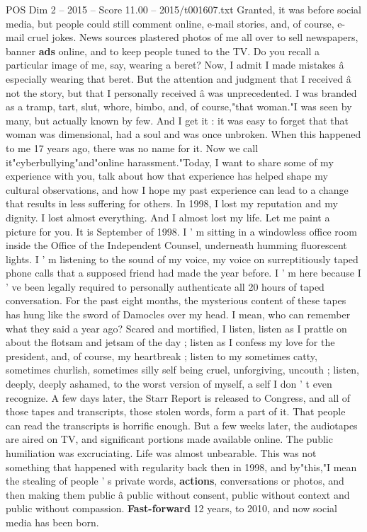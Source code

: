 \begin{textsample}{POS Dim 2 – 2015 – Score 11.00 – 2015/t001607.txt}
Granted, it was before social media, but people could still comment online, e-mail stories, and, of course, e-mail cruel jokes.
News sources plastered photos of me all over to sell newspapers, banner \textbf{ads} online, and to keep people tuned to the TV.
Do you recall a particular image of me, say, wearing a beret?
Now, I admit I made mistakes â especially wearing that beret.
But the attention and judgment that I received â not the story, but that I personally received â was unprecedented.
I was branded as a tramp, tart, slut, whore, bimbo, and, of course,"that woman."I was seen by many, but actually known by few.
And I get it : it was easy to forget that that woman was dimensional, had a soul and was once unbroken.
When this happened to me 17 years ago, there was no name for it.
Now we call it"cyberbullying"and"online harassment."Today, I want to share some of my experience with you, talk about how that experience has helped shape my cultural observations, and how I hope my past experience can lead to a change that results in less suffering for others.
In 1998, I lost my reputation and my dignity.
I lost almost everything.
And I almost lost my life.
Let me paint a picture for you.
It is September of 1998.
I ' m sitting in a windowless office room inside the Office of the Independent Counsel, underneath humming fluorescent lights.
I ' m listening to the sound of my voice, my voice on surreptitiously taped phone calls that a supposed friend had made the year before.
I ' m here because I ' ve been legally required to personally authenticate all 20 hours of taped conversation.
For the past eight months, the mysterious content of these tapes has hung like the sword of Damocles over my head.
I mean, who can remember what they said a year ago?
Scared and mortified, I listen, listen as I prattle on about the flotsam and jetsam of the day ; listen as I confess my love for the president, and, of course, my heartbreak ; listen to my sometimes catty, sometimes churlish, sometimes silly self being cruel, unforgiving, uncouth ; listen, deeply, deeply ashamed, to the worst version of myself, a self I don ' t even recognize.
A few days later, the Starr Report is released to Congress, and all of those tapes and transcripts, those stolen words, form a part of it.
That people can read the transcripts is horrific enough.
But a few weeks later, the audiotapes are aired on TV, and significant portions made available online.
The public humiliation was excruciating.
Life was almost unbearable.
This was not something that happened with regularity back then in 1998, and by"this,"I mean the stealing of people ' s private words, \textbf{actions}, conversations or photos, and then making them public â public without consent, public without context and public without compassion. \textbf{Fast-forward} 12 years, to 2010, and now social media has been born.

\end{textsample}
